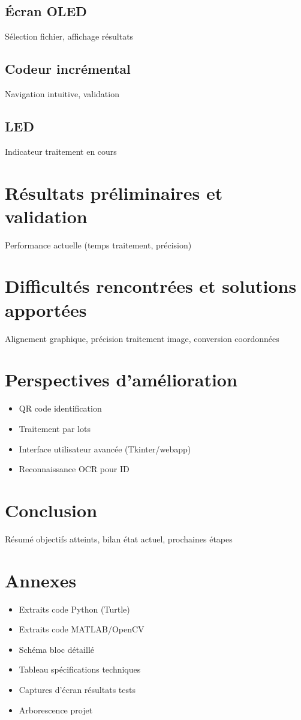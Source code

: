 \documentclass[a4paper,11pt]{article}
\begin{document}
\subsection{Écran OLED}
Sélection fichier, affichage résultats

\subsection{Codeur incrémental}
Navigation intuitive, validation

\subsection{LED}
Indicateur traitement en cours

\section{Résultats préliminaires et validation}
Performance actuelle (temps traitement, précision)

\section{Difficultés rencontrées et solutions apportées}
Alignement graphique, précision traitement image, conversion coordonnées

\section{Perspectives d'amélioration}
\begin{itemize}
    \item QR code identification
    \item Traitement par lots
    \item Interface utilisateur avancée (Tkinter/webapp)
    \item Reconnaissance OCR pour ID
\end{itemize}

\section{Conclusion}
Résumé objectifs atteints, bilan état actuel, prochaines étapes

\appendix

\section{Annexes}
\begin{itemize}
    \item Extraits code Python (Turtle)
    \item Extraits code MATLAB/OpenCV
    \item Schéma bloc détaillé
    \item Tableau spécifications techniques
    \item Captures d'écran résultats tests
    \item Arborescence projet
\end{itemize}
\end{document}
